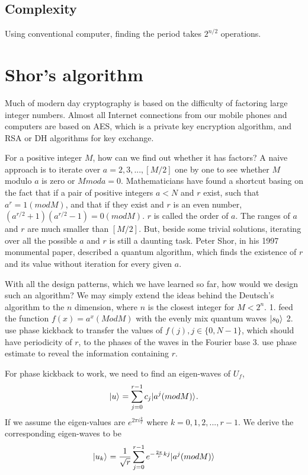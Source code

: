 \documentclass[Letter,11pt]{book}
\begin{document}
\subsection{Complexity}
Using conventional computer, finding the period takes $2^{n/2}$ operations.

\section{Shor's algorithm}
Much of modern day cryptography is based on the difficulty of factoring large integer numbers. Almost all Internet connections from our mobile phones and computers are based on AES, which is a private key encryption algorithm, and RSA or DH algorithms for key exchange.

For a positive integer $M$, how can we find out whether it has factors? A naive approach is to iterate over
$a=2, 3, ..., [M/2]$ one by one to see whether $M$ modulo $a$ is zero or $M mod a = 0$. Mathematicians have found a shortcut basing on the fact that if a pair of positive integers $a < N$ and $r$ exist, such that $a^r = 1(mod M)$, and that if they exist and $r$ is an even number, $(a^{r/2}+1)(a^{r/2}-1) = 0 (mod M)$. $r$ is called the order of $a$. The ranges of $a$ and $r$ are much smaller than $[M/2]$. But, beside some trivial solutions, iterating over all the possible $a$ and $r$ is still a daunting task. Peter Shor, in his 1997 monumental paper\cite{1997Shor}, described a quantum algorithm, which finds the existence of $r$ and its value without iteration for every given $a$.

With all the design patterns, which we have learned so far, how would we design such an algorithm? We may simply extend the ideas behind the Deutsch's algorithm to the $n$ dimension, where $n$ is the closest integer for $M < 2^n$.
1. feed the function $f(x) = a^x (Mod M)$ with the evenly mix quantum waves $\vert {s_0} \rangle_{}$
2. use phase kickback to transfer the values of $f(j), j\in \{0,N-1\}$, which should have periodicity of $r$, to the phases of the waves in the Fourier base
3. use phase estimate to reveal the information containing $r$.

For phase kickback to work, we need to find an eigen-waves of $U_f$,
\begin{equation}\label{keta_u}
    \vert {u} \rangle_{} = \sum^{r-1}_{j=0} c_j \vert {a^j (mod M)} \rangle_{}.
\end{equation}
If we assume the eigen-values are $e^{2\pi i \frac k r}$ where $k=0, 1, 2, ..., r-1$. We derive the corresponding eigen-waves to be
\begin{equation}\label{keta_uk}
    \vert {u_k} \rangle_{} = \frac 1 {\sqrt{r}} \sum^{r-1}_{j=0} e^{-{\frac {2\pi} r} kj} \vert {a^j (mod M)} \rangle_{}
\end{equation}
\end{document}
